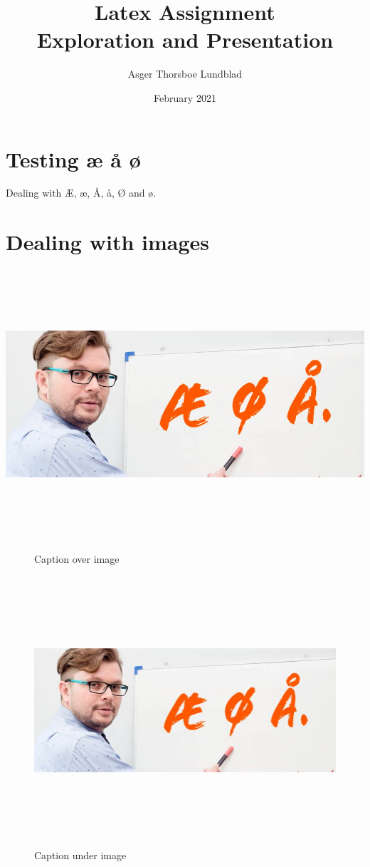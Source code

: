 \documentclass{article}
\title{Latex Assignment \\
 \large Exploration and Presentation}
\author{Asger Thorsboe Lundblad}
\date{February 2021}
\begin{document}
\maketitle

\tableofcontents
\listoffigures

\section{Testing æ å ø}
Dealing with Æ, æ, Å, å, Ø and ø.

\section{Dealing with images}
\FloatBarrier
\includegraphics[width=\textwidth, height=10cm]{Alphabet41393.jpg}

\begin{figure}[h]
    \centering
    \caption{Caption over image}
    \includegraphics[width=12cm, height=10cm]{Alphabet41393.jpg}
    \caption{Caption under image}
    \label{fig:fig1}
\end{figure}
\end{document}
